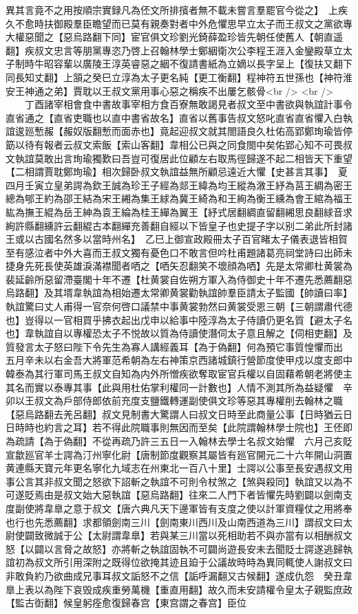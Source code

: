 異其言竟不之用按順宗實録凡為伾文所排擯者無不載未嘗言羣罷官今從之】　上疾久不愈時扶御殿羣臣瞻望而已莫有親奏對者中外危懼思早立太子而王叔文之黨欲專大權惡聞之【惡烏路翻下同】宦官俱文珍劉光錡薛盈珍皆先朝任使舊人【朝直遥翻】疾叔文忠言等朋黨專恣乃啓上召翰林學士鄭絪衛次公李程王涯入金鑾殿草立太子制時牛昭容輩以廣陵王淳英睿惡之絪不復請書紙為立嫡以長字呈上【復扶又翻下同長知丈翻】上頷之癸巳立淳為太子更名純【更工衡翻】程神符五世孫也【神符淮安王神通之弟】賈耽以王叔文黨用事心惡之稱疾不出屢乞骸骨<br />
<br />
　　丁酉諸宰相會食中書故事宰相方食百寮無敢謁見者叔文至中書欲與執誼計事令直省通之【直省吏職也以直中書省故名】直省以舊事告叔文怒叱直省直省懼入白執誼逡廵慙赧【赧奴版翻慙而面赤也】竟起迎叔文就其閤語良久杜佑高郢鄭珣瑜皆停筯以待有報者云叔文索飯【索山客翻】韋相公已與之同食閤中矣佑郢心知不可畏叔文執誼莫敢出言珣瑜獨歎曰吾豈可復居此位顧左右取馬徑歸遂不起二相皆天下重望【二相謂賈耽鄭珣瑜】相次歸卧叔文執誼益無所顧忌遠近大懼【史甚言其事】　夏四月壬寅立皇弟諤為欽王誠為珍王子經為郯王緯為均王縱為漵王紓為莒王綢為密王總為郇王約為邵王結為宋王緗為集王絿為冀王綺為和王絢為衡王纁為會王綰為福王紘為撫王緄為岳王紳為袁王綸為桂王繟為翼王【紓式居翻綢直留翻緗思良翻絿音求絢許縣翻纁許云翻緄古本翻繟充善翻自經以下皆皇子也史提子字以别二弟此所封諸王或以古國名然多以當時州名】　乙巳上御宣政殿冊太子百官睹太子儀表退皆相賀至有感泣者中外大喜而王叔文獨有憂色口不敢言但吟杜甫題諸葛亮祠堂詩曰出師未捷身先死長使英雄淚滿襟聞者哂之【哂矢忍翻笑不壞顔為哂】先是太常卿杜黄裳為裴延齡所惡留滯臺閣十年不遷【杜黄裳自佐朔方軍入為侍御史十年不遷先悉薦翻惡烏路翻】及其壻韋執誼為相始遷太常卿黄裳勸執誼帥羣臣請太子監國【帥讀曰率】執誼驚曰丈人甫得一官奈何啓口議禁中事黄裳勃然曰黄裳受恩三朝【三朝謂肅代德也】豈得以一官相買乎拂衣起出戊申以給事中陸淳為太子侍讀仍更名質【避太子名也】韋執誼自以專權恐太子不悦故以質為侍讀使潛伺太子意且解之【伺相吏翻】及質發言太子怒曰陛下令先生為寡人講經義耳【為于偽翻】何為預它事質惶懼而出　五月辛未以右金吾大將軍范希朝為左右神策京西諸城鎮行營節度使甲戍以度支郎中韓泰為其行軍司馬王叔文自知為内外所憎疾欲奪取宦官兵權以自固藉希朝老將使主其名而實以泰專其事【此與用杜佑掌利權同一計數也】人情不測其所為益疑懼　辛卯以王叔文為戶部侍郎依前充度支鹽鐵轉運副使俱文珍等惡其專權削去翰林之職【惡烏路翻去羌呂翻】叔文見制書大驚謂人曰叔文日時至此商量公事【日時猶云日日時時也約言之耳】若不得此院職事則無因而至矣【此院謂翰林學士院也】王伾即為疏請【為于偽翻】不從再疏乃許三五日一入翰林去學士名叔文始懼　六月己亥貶宣歙廵官羊士諤為汀州寧化尉【唐制節度觀察其屬皆有廵官開元二十六年開山洞置黄連縣天寶元年更名寧化九域志在州東北一百八十里】士諤以公事至長安遇叔文用事公言其非叔文聞之怒欲下詔斬之執誼不可則令杖煞之【煞與殺同】執誼又以為不可遂貶焉由是叔文始大惡執誼【惡烏路翻】往來二人門下者皆懼先時劉闢以劍南支度副使將韋臯之意于叔文【唐六典凡天下邊軍皆有支度之使以計軍資糧仗之用將奉也行也先悉薦翻】求都領劍南三川【劍南東川西川及山南西道為三川】謂叔文曰太尉使闢致微誠于公【太尉謂韋臯】若與某三川當以死相助若不與亦當有以相酬叔文怒【以闢以言脅之故怒】亦將斬之執誼固執不可闢尚遊長安未去聞貶士諤遂逃歸執誼初為叔文所引用深附之既得位欲掩其迹且廹于公議故時時為異同輒使人謝叔文曰非敢負約乃欲曲成兄事耳叔文詬怒不之信【詬呼漏翻又古候翻】遂成仇怨　癸丑韋臯上表以為陛下哀毁成疾重勞萬機【重直用翻】故久而未安請權令皇太子親監庶政【監古衘翻】候皇躬痊愈復歸春宫【東宫謂之春宫】臣位